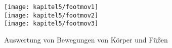 \begin{figure}[t!]
    \texttt{[image: kapitel5/footmov1]}\hfill
    \\[\smallskipamount]
    \texttt{[image: kapitel5/footmov2]}\hfill
    \\[\smallskipamount]
    \texttt{[image: kapitel5/footmov3]}\hfill
    \caption{Auswertung von Bewegungen von Körper und Füßen}\label{kap5:footCenterMovements}
\end{figure}